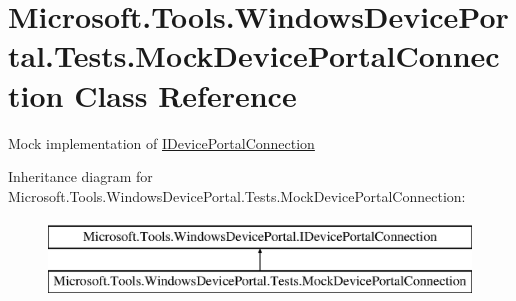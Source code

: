 \hypertarget{class_microsoft_1_1_tools_1_1_windows_device_portal_1_1_tests_1_1_mock_device_portal_connection}{}\section{Microsoft.\+Tools.\+Windows\+Device\+Portal.\+Tests.\+Mock\+Device\+Portal\+Connection Class Reference}
\label{class_microsoft_1_1_tools_1_1_windows_device_portal_1_1_tests_1_1_mock_device_portal_connection}


Mock implementation of \hyperlink{interface_microsoft_1_1_tools_1_1_windows_device_portal_1_1_i_device_portal_connection}{I\+Device\+Portal\+Connection}  


Inheritance diagram for Microsoft.\+Tools.\+Windows\+Device\+Portal.\+Tests.\+Mock\+Device\+Portal\+Connection\+:\begin{figure}[H]
\begin{center}
\leavevmode
\includegraphics[height=2.000000cm]{class_microsoft_1_1_tools_1_1_windows_device_portal_1_1_tests_1_1_mock_device_portal_connection}
\end{center}
\end{figure}

